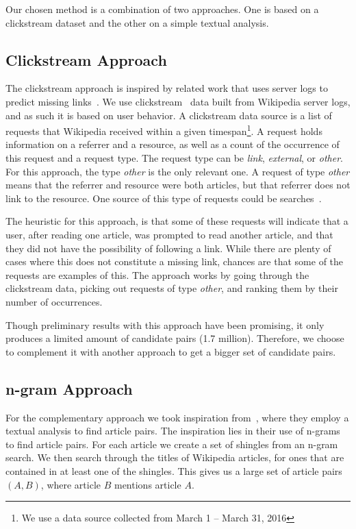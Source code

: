 Our chosen method is a combination of two approaches. One is based on a clickstream dataset and the other on a simple textual analysis.

\subsection{Clickstream Approach}\label{sec:candidate_clickstream}

The clickstream approach is inspired by related work that uses server logs to predict missing links~\cite{hyperlink-structure-using-logs}. We use clickstream~\cite{wiki-clickstream} data built from Wikipedia server logs, and as such it is based on user behavior. A clickstream data source is a list of requests that Wikipedia received within a given timespan\footnote{We use a data source collected from March 1 -- March 31, 2016}. A request holds information on a referrer and a resource, as well as a count of the occurrence of this request and a request type. The request type can be \emph{link}, \emph{external}, or \emph{other}. For this approach, the type \emph{other} is the only relevant one. A request of type \emph{other} means that the referrer and resource were both articles, but that referrer does not link to the resource. One source of this type of requests could be searches~\cite{wiki-clickstream}.

The heuristic for this approach, is that some of these requests will indicate that a user, after reading one article, was prompted to read another article, and that they did not have the possibility of following a link. While there are plenty of cases where this does not constitute a missing link, chances are that some of the requests are examples of this. The approach works by going through the clickstream data, picking out requests of type \emph{other}, and ranking them by their number of occurrences.

Though preliminary results with this approach have been promising, it only produces a limited amount of candidate pairs (1.7 million). Therefore, we choose to complement it with another approach to get a bigger set of candidate pairs.

\subsection{n-gram Approach}

For the complementary approach we took inspiration from~\cite{milne2008learning}, where they employ a textual analysis to find article pairs. The inspiration lies in their use of n-grams to find article pairs. For each article we create a set of shingles from an n-gram search. We then search through the titles of Wikipedia articles, for ones that are contained in at least one of the shingles. This gives us a large set of article pairs $(A,B)$, where article $B$ mentions article $A$.

